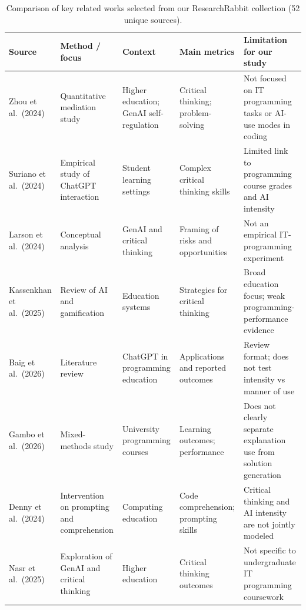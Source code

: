 \documentclass[11pt,a4paper]{article}
\begin{document}
\begin{table}[H]
\centering
\small
\renewcommand{\arraystretch}{1.1}
\caption{Comparison of key related works selected from our ResearchRabbit collection (52 unique sources).}
\label{tab:matrix}
\begin{tabularx}{\textwidth}{@{}>{\raggedright\arraybackslash}p{2.35cm}>{\raggedright\arraybackslash}p{2.45cm}>{\raggedright\arraybackslash}p{2.35cm}>{\raggedright\arraybackslash}p{2.15cm}>{\raggedright\arraybackslash}X@{}}
\toprule
\textbf{Source} & \textbf{Method / focus} & \textbf{Context} & \textbf{Main metrics} & \textbf{Limitation for our study} \\
\midrule
Zhou et al.\ (2024) & Quantitative mediation study & Higher education; GenAI self-regulation & Critical thinking; problem-solving & Not focused on IT programming tasks or AI-use modes in coding \\
\addlinespace
Suriano et al.\ (2024) & Empirical study of ChatGPT interaction & Student learning settings & Complex critical thinking skills & Limited link to programming course grades and AI intensity \\
\addlinespace
Larson et al.\ (2024) & Conceptual analysis & GenAI and critical thinking & Framing of risks and opportunities & Not an empirical IT-programming experiment \\
\addlinespace
Kassenkhan et al.\ (2025) & Review of AI and gamification & Education systems & Strategies for critical thinking & Broad education focus; weak programming-performance evidence \\
\addlinespace
Baig et al.\ (2026) & Literature review & ChatGPT in programming education & Applications and reported outcomes & Review format; does not test intensity vs manner of use \\
\addlinespace
Gambo et al.\ (2026) & Mixed-methods study & University programming courses & Learning outcomes; performance & Does not clearly separate explanation use from solution generation \\
\addlinespace
Denny et al.\ (2024) & Intervention on prompting and comprehension & Computing education & Code comprehension; prompting skills & Critical thinking and AI intensity are not jointly modeled \\
\addlinespace
Nasr et al.\ (2025) & Exploration of GenAI and critical thinking & Higher education & Critical thinking outcomes & Not specific to undergraduate IT programming coursework \\
\bottomrule
\end{tabularx}
\end{table}
\end{document}
